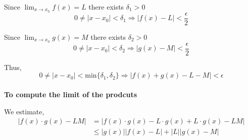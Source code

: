 \documentclass{article}
\begin{document}
Since \(\lim_{x\to x_0}{f(x)} = L\) there exists \(\delta_1 > 0 \)
\[
0 \neq |x-x_0|<\delta_1 \Rightarrow |f(x)-L| < \frac{\epsilon}{2}
\]

Since \(\lim_{x\to x_0}{g(x)} = M\) there exists \(\delta_2 > 0 \)
\[
0 \neq |x-x_0|<\delta_2 \Rightarrow |g(x)-M| < \frac{\epsilon}{2}
\]

Thus,
\[
0 \neq |x-x_0| < \text{min}\{\delta_1,\delta_2\} \Rightarrow |f(x) + g(x)-L-M| < \epsilon
\]
\\

\textbf{To compute the limit of the prodcuts}

We estimate,
\begin{align*}
    |f(x)\cdot g(x)-LM| &= |f(x)\cdot g(x) -L\cdot g(x) + L \cdot g(x) -LM| \\
    &\leq |g(x)||f(x) - L| + |L||g(x)-M|
\end{align*}
\end{document}

